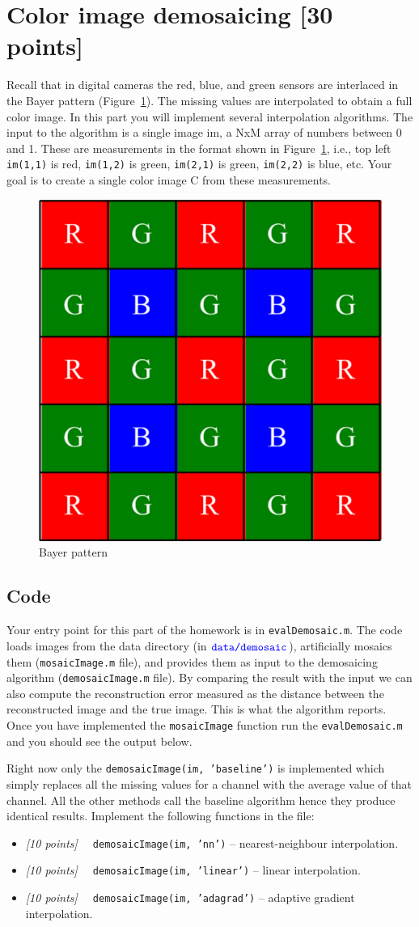 \documentclass[10pt,letterpaper]{article}
\newcommand{\cmd}[1] {{\color{blue}\texttt{#1}}}
\newcommand{\points}[1]{{\color{mygreen}\emph{[#1]\ \ }}}
\begin{document}
\newpage
\section{Color image demosaicing [30 points]}
Recall that in digital cameras the red, blue, and green sensors are interlaced in the Bayer pattern (Figure~\ref{fig:bayer}). The missing values are interpolated to obtain a full color image. In this part you will implement several interpolation algorithms. The input to the algorithm is a single image im, a NxM array of numbers between 0 and 1. These are measurements in the format shown in Figure~\ref{fig:bayer}, i.e., top left \cmd{im(1,1)} is red, \cmd{im(1,2)} is green, \cmd{im(2,1)} is green, \cmd{im(2,2)} is blue, etc. Your goal is to create a single color image C from these measurements.
\begin{figure}[h]
\centering
\includegraphics[width=0.2\linewidth]{bayer-pattern.png}
\caption{\label{fig:bayer} Bayer pattern}
\end{figure}

\subsection{Code}
Your entry point for this part of the homework is in \cmd{evalDemosaic.m}. The code loads images from the data directory (in $\cmd{data/demosaic}$), artificially mosaics them (\cmd{mosaicImage.m} file), and provides them as input to the demosaicing algorithm (\cmd{demosaicImage.m} file). By comparing the result with the input we can also compute the reconstruction error measured as the distance between the reconstructed image and the true image. This is what the algorithm reports. Once you have implemented the \cmd{mosaicImage} function run the \cmd{evalDemosaic.m} and you should see the output below.

Right now only the \cmd{demosaicImage(im, 'baseline')} is implemented which simply replaces all the missing values for a channel with the average value of that channel. All the other methods call the baseline algorithm hence they produce identical results. Implement the following functions in the file:

\begin{itemize}
\item \points{10 points} \cmd{demosaicImage(im, 'nn')} -- nearest-neighbour interpolation.
\item \points{10 points} \cmd{demosaicImage(im, 'linear')} -- linear interpolation.
\item \points{10 points} \cmd{demosaicImage(im, 'adagrad')} -- adaptive gradient interpolation.
\end{itemize}
\end{document}
